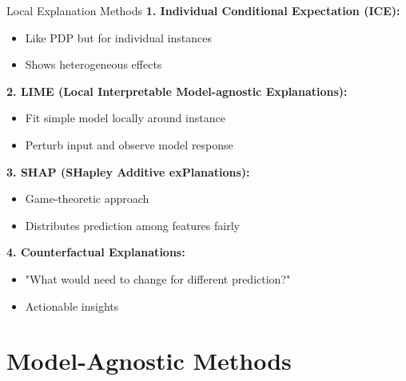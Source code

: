 \documentclass[aspectratio=169]{beamer}
\begin{document}
\begin{frame}{Local Explanation Methods}
  \textbf{1. Individual Conditional Expectation (ICE):}
  \begin{itemize}
    \item Like PDP but for individual instances
    \item Shows heterogeneous effects
  \end{itemize}

  \vspace{0.5em}

  \textbf{2. LIME (Local Interpretable Model-agnostic Explanations):}
  \begin{itemize}
    \item Fit simple model locally around instance
    \item Perturb input and observe model response
  \end{itemize}

  \vspace{0.5em}

  \textbf{3. SHAP (SHapley Additive exPlanations):}
  \begin{itemize}
    \item Game-theoretic approach
    \item Distributes prediction among features fairly
  \end{itemize}

  \vspace{0.5em}

  \textbf{4. Counterfactual Explanations:}
  \begin{itemize}
    \item "What would need to change for different prediction?"
    \item Actionable insights
  \end{itemize}
\end{frame}

\section{Model-Agnostic Methods}
\end{document}
